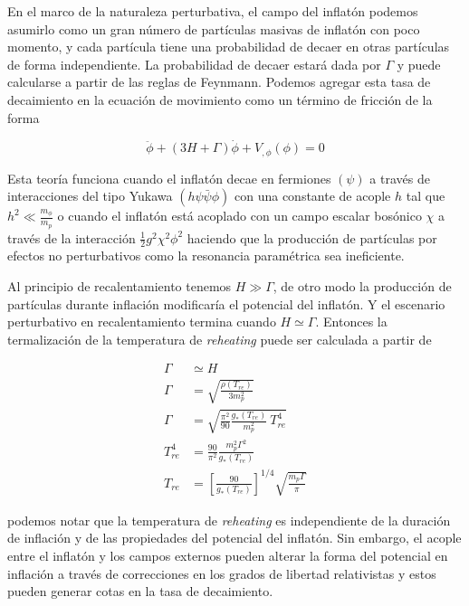 En el marco de la naturaleza perturbativa, el campo del inflatón podemos asumirlo como un gran número de partículas masivas de inflatón con poco momento, y cada partícula tiene una probabilidad de decaer en otras partículas de forma independiente. La probabilidad de decaer estará dada por $\Gamma$ y puede calcularse a partir de las reglas de Feynmann. Podemos agregar esta tasa de decaimiento en la ecuación de movimiento como un término de fricción de la forma

\begin{equation}
    \ddot{\phi} + (3H + \Gamma) \dot{\phi} + V_{,\phi} (\phi) =0
\end{equation}

Esta teoría funciona cuando el inflatón decae en fermiones $(\psi)$ a través de interacciones del tipo Yukawa $(h \psi \bar{\psi} \phi)$ con una constante de acople $h$ tal que $h^2 \ll \displaystyle \frac{m_\phi}{m_p}$ o cuando el inflatón está acoplado con un campo escalar bosónico $\chi$ a través de la interacción $\displaystyle \frac{1}{2} g^2 \chi^2 \phi^2$ haciendo que la producción de partículas por efectos no perturbativos como la resonancia paramétrica sea ineficiente.

Al principio de recalentamiento tenemos $H \gg \Gamma$, de otro modo la producción de partículas durante inflación modificaría el potencial del inflatón. Y el escenario perturbativo en recalentamiento termina cuando $H \simeq \Gamma$. Entonces la termalización de la temperatura de \textit{reheating} puede ser calculada a partir de 

\begin{equation*}
    \begin{split} 
        \Gamma &\simeq H\\
        \Gamma &= \sqrt{\frac{\rho (T_{re})}{3 m_p^2}}\\
        \Gamma &= \sqrt{\frac{\pi^2}{90} \frac{g_* (T_{re})}{m_p^2} \ T_{re}^4}\\
        T_{re}^4 &= \frac{90}{\pi^2} \frac{m_p^2 \Gamma^2}{g_* (T_{re})}\\
        T_{re} &= \left[ \frac{90}{g_* (T_{re})} \right]^{1/4} \sqrt{\frac{m_p \Gamma}{\pi}}
    \end{split}
\end{equation*}

\noindent
podemos notar que la temperatura de \textit{reheating} es independiente de la duración de inflación y de las propiedades del potencial del inflatón. Sin embargo, el acople entre el inflatón y los campos externos pueden alterar la forma del potencial en inflación a través de correcciones en los grados de libertad relativistas y estos pueden generar cotas en la tasa de decaimiento.

